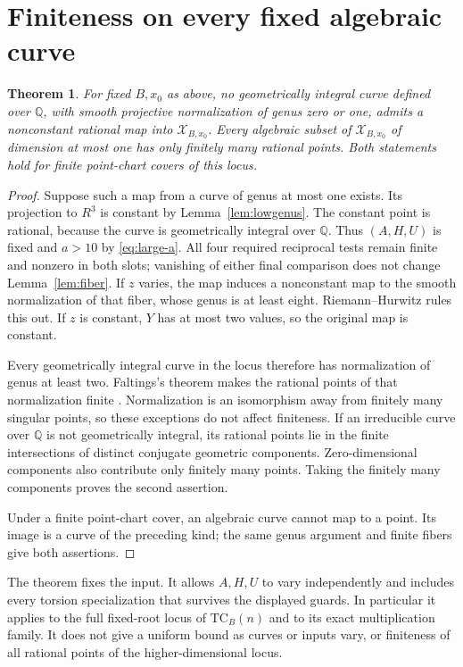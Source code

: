 \documentclass[11pt,a4paper]{article}
\newtheorem{theorem}{Theorem}[section]
\newcommand{\Q}{\mathbb Q}\newcommand{\Z}{\mathbb Z}
\begin{document}
\section{Finiteness on every fixed algebraic curve}

\begin{theorem}\label{thm:curves}
For fixed $B,x_0$ as above, no geometrically integral curve defined
over $\Q$, with smooth projective normalization of genus zero or
one, admits a nonconstant rational map into $\mathcal X_{B,x_0}$.
Every algebraic subset of $\mathcal X_{B,x_0}$ of dimension at
most one has only finitely many rational points. Both statements
hold for finite point-chart covers of this locus.
\end{theorem}
\begin{proof}
Suppose such a map from a curve of genus at most one exists.
Its projection to $R^3$ is constant by Lemma~\ref{lem:lowgenus}.
The constant point is rational, because the curve is geometrically
integral over $\Q$. Thus $(A,H,U)$ is fixed and $a>10$ by
\eqref{eq:large-a}. All four required reciprocal tests remain
finite and nonzero in both slots; vanishing of either final
comparison does not change Lemma~\ref{lem:fiber}.
If $z$ varies, the map induces a nonconstant map to the smooth
normalization of that fiber, whose genus is at least eight.
Riemann--Hurwitz rules this out. If $z$ is constant, $Y$ has
at most two values, so the original map is constant.

Every geometrically integral curve in the locus therefore has
normalization of genus at least two. Faltings's theorem makes
the rational points of that normalization finite \cite{Faltings}.
Normalization is an isomorphism away from finitely many singular
points, so these exceptions do not affect finiteness. If an
irreducible curve over $\Q$ is not geometrically integral, its
rational points lie in the finite intersections of distinct
conjugate geometric components. Zero-dimensional components also
contribute only finitely many points. Taking the finitely many
components proves the second assertion.

Under a finite point-chart cover, an algebraic curve cannot map
to a point. Its image is a curve of the preceding kind; the same
genus argument and finite fibers give both assertions.
\end{proof}

The theorem fixes the input. It allows $A,H,U$ to vary independently
and includes every torsion specialization that survives the displayed
guards. In particular it applies to the full fixed-root locus of
$\mathrm{TC}_B(n)$ and to its exact multiplication family. It does
not give a uniform bound as curves or inputs vary, or finiteness of
all rational points of the higher-dimensional locus.
\end{document}
